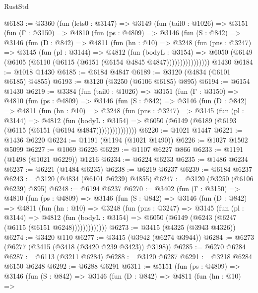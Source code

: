 \begin{lexlean}{RustStd}
\begin{coremodule}
@6183 := @3360
    (fun (lets0 : @3147) =>
    @3149
      (fun (tail0 : @1026) =>
      @3151
        (fun (Γ : @3150) =>
        @4810
          (fun (ps : @4809) =>
          @3146
            (fun (S : @842) =>
            @3146
              (fun (D : @842) =>
              @4811
                (fun (hn : @10) =>
                @3248
                  (fun (pns : @3247) =>
                  @3145
                    (fun (pl : @3144) =>
                    @4812
                      (fun (bodyL : @3154) =>
                      @6050 (@6149 (@6105 (@6110 (@6115 (@6151 (@6154 @4845 @4847))))))))))))))))
    @1430
@6184 := @1018 @1430
@6185 := @6184 @4847
@6189 := @3120 (@4834 (@6101 @6185) @4855)
@6193 := @3120 (@3250 (@6106 @6185) @895)
@6194 := @6154 @1430
@6219 := @3384
    (fun (tail0 : @1026) =>
    @3151
      (fun (Γ : @3150) =>
      @4810
        (fun (ps : @4809) =>
        @3146
          (fun (S : @842) =>
          @3146
            (fun (D : @842) =>
            @4811
              (fun (hn : @10) =>
              @3248
                (fun (pns : @3247) =>
                @3145
                  (fun (pl : @3144) =>
                  @4812
                    (fun (bodyL : @3154) =>
                    @6050 (@6149 (@6189 (@6193 (@6115 (@6151 (@6194 @4847)))))))))))))))
@6220 := @1021 @1447
@6221 := @1436 @6220
@6224 := @1191 (@1194 (@1021 @1490))
@6226 := @1027 @1502 @5099
@6227 := @1069 @6226
@6229 := @1107 @6227 @866
@6233 := @1191 (@1498 (@1021 @6229)) @1216
@6234 := @6224 @6233
@6235 := @1486 @6234
@6237 := @6221 (@1484 @6235)
@6238 := @6219 @6237
@6239 := @6184 @6237
@6243 := @3120 (@4834 (@6101 @6239) @4855)
@6247 := @3120 (@3250 (@6106 @6239) @895)
@6248 := @6194 @6237
@6270 := @3402
    (fun (Γ : @3150) =>
    @4810
      (fun (ps : @4809) =>
      @3146
        (fun (S : @842) =>
        @3146
          (fun (D : @842) =>
          @4811
            (fun (hn : @10) =>
            @3248
              (fun (pns : @3247) =>
              @3145
                (fun (pl : @3144) =>
                @4812
                  (fun (bodyL : @3154) =>
                  @6050 (@6149 (@6243 (@6247 (@6115 (@6151 @6248)))))))))))))
@6273 := @3415 (@4325 (@3943 @4326))
@6274 := @3420 @110
@6277 := @3415 (@3942 (@6274 @3944))
@6284 := @6273 (@6277 (@3415 (@3418 (@3420 @239 @3423)) @3198))
@6285 := @6270 @6284
@6287 := @6113 (@3211 @6284)
@6288 := @3120 @6287
@6291 := @3218 @6284 @6150 @6248
@6292 := @6288 @6291
@6311 := @5151
    (fun (ps : @4809) =>
    @3146
      (fun (S : @842) =>
      @3146
        (fun (D : @842) =>
        @4811
          (fun (hn : @10) =>

\end{coremodule}
\end{lexlean}
